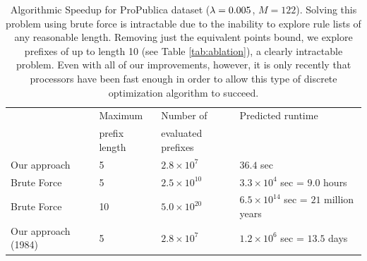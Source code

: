 \begin{table}[]
\centering
\begin{tabular}{|l|l|l|l|}
\hline
& Maximum & Number of & Predicted runtime \\
& prefix length & evaluated prefixes & \\ \hline
Our approach & 5  & $ 2.8 \times 10^7$ & $36.4$ sec             \\ \hline
Brute Force & 5 & $2.5 \times 10^{10}$ & $3.3 \times 10^4$ sec = $9.0$ hours           \\ \hline
Brute Force & 10 & $5.0 \times 10^{20}$ & $6.5 \times 10^{14}$ sec = $21$ million years          \\ \hline
Our approach (1984) & 5 & $2.8 \times 10^7$ & $1.2 \times 10^6$ sec = $13.5$ days          \\ \hline
\end{tabular}
\caption{Algorithmic Speedup for ProPublica dataset (${{\lambda} = 0.005}$, ${M = 122}$).
%
Solving this problem using brute force is intractable due to the inability to explore rule lists of any reasonable length.
%
Removing just the equivalent points bound, we explore prefixes of up to length 10 (see Table \ref{tab:ablation}), a clearly intractable problem.
%
Even with all of our improvements, however, it is only recently that processors have been fast enough in order to allow this type of discrete optimization algorithm to succeed.
}
\vspace{4mm}
\label{tab:speedup}
\end{table}
